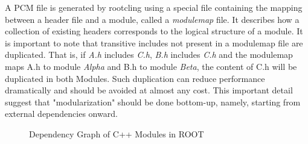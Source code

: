 \documentclass[12pt]{iopart}
\begin{document}
A PCM file is generated by rootcling using a special file containing the mapping between a header file and a module, called a \textit{modulemap} file. It describes how a collection of existing headers corresponds to the logical structure of a module. It is important to note that transitive includes not present in a modulemap file are duplicated. That is, if \textit{A.h} includes \textit{C.h}, \textit{B.h} includes \textit{C.h} and the modulemap maps A.h to module \textit{Alpha} and B.h to module \textit{Beta}, the content of C.h will be duplicated in both Modules. Such duplication can reduce performance dramatically and should be avoided at almost any cost. This important detail suggest that "modularization" should be done bottom-up, namely, starting from external dependencies onward.

\begin{figure}[!h]
  \centering
  \caption{Dependency Graph of C++ Modules in ROOT}
  \label{fig:pchandpcm}
\end{figure}



\end{document}
